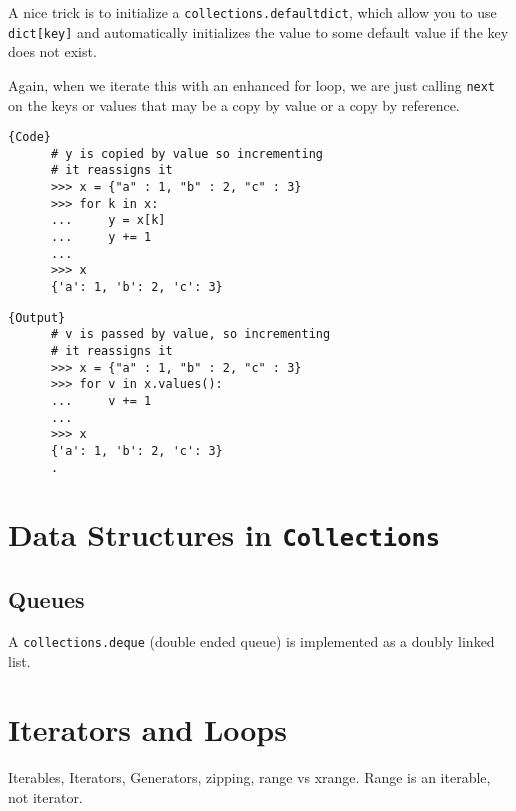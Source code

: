 \documentclass{article}
\begin{document}
  A nice trick is to initialize a \texttt{collections.defaultdict}, which allow you to use \texttt{dict[key]} and automatically initializes the value to some default value if the key does not exist. 

  \begin{example}
    Again, when we iterate this with an enhanced for loop, we are just calling \texttt{next} on the keys or values that may be a copy by value or a copy by reference. 

    \noindent\begin{minipage}{.5\textwidth}
    \begin{lstlisting}[]{Code}
      # y is copied by value so incrementing 
      # it reassigns it
      >>> x = {"a" : 1, "b" : 2, "c" : 3}
      >>> for k in x: 
      ...     y = x[k]
      ...     y += 1
      ... 
      >>> x
      {'a': 1, 'b': 2, 'c': 3} 
    \end{lstlisting}
    \end{minipage}
    \hfill
    \begin{minipage}{.49\textwidth}
    \begin{lstlisting}[]{Output}
      # v is passed by value, so incrementing 
      # it reassigns it 
      >>> x = {"a" : 1, "b" : 2, "c" : 3}
      >>> for v in x.values(): 
      ...     v += 1
      ... 
      >>> x
      {'a': 1, 'b': 2, 'c': 3} 
      .
    \end{lstlisting}
    \end{minipage}
  \end{example}

\section{Data Structures in \texttt{Collections}}

  \subsection{Queues} 

    A \texttt{collections.deque} (double ended queue) is implemented as a doubly linked list. 

\section{Iterators and Loops}

  Iterables, Iterators, Generators, zipping, range vs xrange. Range is an iterable, not iterator. 
\end{document}
